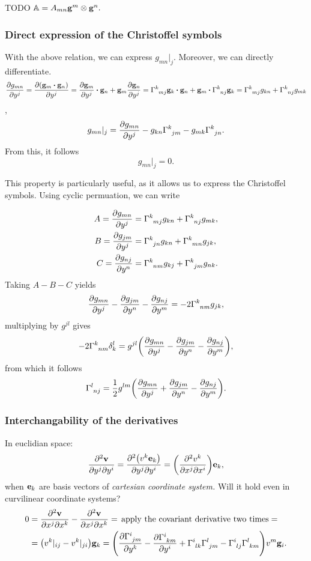 \documentclass[reqno, a4paper]{article}
\begin{document}
TODO $\mathbb{A} = A_{mn}\vb{g}^m \otimes \vb{g}^n.$

\subsubsection{Direct expression of the Christoffel symbols}
\label{sec:christoffel_expression}
With the above relation, we can express $g_{mn}|_j$. Moreover, we can directly differentiate.
\[
	\pdv{g_{mn}}{y^j}=\pdv{\qty(\vb{g}_m \vdot \vb{g}_n)}{y^j} = \pdv{\vb{g}_m}{y^j} \vdot \vb{g}_n + \vb{g}_m \pdv{\vb{g}_n}{y^j}=\Gamma \indices{^k_{mj}}\vb{g}_k \vdot \vb{g}_n + \vb{g}_m \vdot \Gamma \indices{^k_{nj}}\vb{g}_k = \Gamma \indices{^k_{mj}}g_{kn} + \Gamma \indices{^k_{nj}}g_{mk}
\]
,
\[
	g_{mn}|_j = \pdv{g_{mn}}{y^j}-g_{kn}\Gamma \indices{^k_{jm}}-g_{mk} \Gamma \indices{^k_{jn}}.
\]
From this, it follows
\begin{equation}
    g_{mn}|_j = 0.
\end{equation}

This property is particularly useful, as it allows us to express the Christoffel symbols. Using cyclic permuation, we can write

\begin{align*}
A=	\pdv{g_{mn}}{y^j} &= \Gamma \indices{^k_{mj}}g_{kn} + \Gamma \indices{^k_{nj}}g_{mk}, \\
B=	\pdv{g_{jm}}{y^j} &= \Gamma \indices{^k_{jn}} g_{kn} + \Gamma \indices{^k_{mn}}g_{jk}, \\
C=	\pdv{g_{nj}}{y^n} &= \Gamma \indices{^k_{nm}}g_{kj} + \Gamma \indices{^k_{jm}} g_{nk}.
\end{align*}
Taking $A-B-C$ yields
\[
	\pdv{g_{mn}}{y^j}-\pdv{g_{jm}}{y^n}-\pdv{g_{nj}}{y^m} = -2 \Gamma \indices{^k_{nm}}g_{jk},
\]
multiplying by $g^{jl}$ gives
\[
	-2 \Gamma \indices{^k_{nm}}\delta^l_k = g^{jl}\qty(\pdv{g_{mn}}{y^j}-\pdv{g_{jm}}{y^n}-\pdv{g_{nj}}{y^m}),
\]
from which it follows
\begin{equation}
	\label{eq:christoffel}
	\Gamma \indices{^l_{nj}} = \frac{1}{2}g^{lm}\qty(\pdv{g_{mn}}{y^j}+\pdv{g_{jm}}{y^n}-\pdv{g_{nj}}{y^m}).
\end{equation}


\subsubsection{Interchangability of the derivatives}
\label{sec:interchangability}
In euclidian space:
\[
	\pdv[2]{\vb{v}}{y^j}{y^i} = \pdv[2]{\qty(v^k \vb{e}_k)}{y^j}{y^i}= \qty(\pdv[2]{v^k}{x^j}{x^i}) \vb{e}_k,
\]
when $\vb{e}_k$ are basis vectors of \textit{cartesian coordinate system.} Will it hold even in curvilinear coordinate systems?
\begin{align*}
	0 &= \pdv[2]{\vb{v}}{x^j}{x^k} - \pdv[2]{\vb{v}}{x^j}{x^k} = \, \text{apply the covariant derivative two times}= \, \\&=
   \qty(v^k|_{ij} - v^k|_{ji})\vb{g}_k = \qty(\pdv{\Gamma \indices{^i_{jm}}}{y^k} - \pdv{\Gamma \indices{^i_{km}}}{y^i} + \Gamma \indices{^i_{lk}} \Gamma \indices{^l_{jm}}- \Gamma \indices{^i_{lj}} \Gamma \indices{^l_{km}})v^m \vb{g}_i.
\end{align*}
\end{document}
